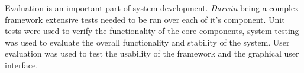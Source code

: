 Evaluation is an important part of system development. \textit{Darwin} being a complex framework extensive
tests needed to be ran over each of it's component. Unit tests were used to verify the functionality of the
core components, system testing was used to evaluate the overall functionality and stability of the system.
User evaluation was used to test the usability of the framework and the graphical user interface.